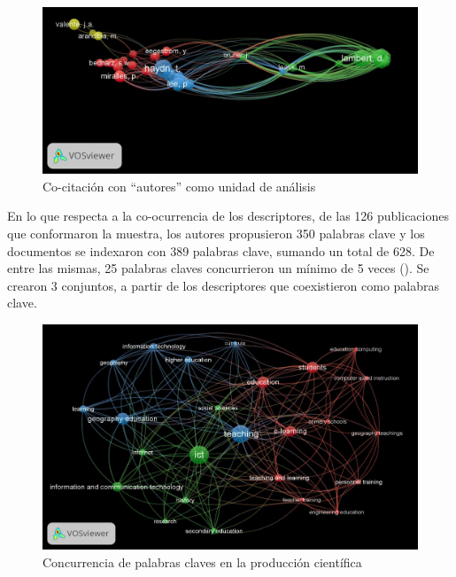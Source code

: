 \documentclass[spanish]{textolivre}
\begin{document}
\begin{figure}[h!]
\centering
\begin{minipage}{.9\textwidth}
 \includegraphics[width=\textwidth]{fig5.jpg}
 \caption{Co-citación con “autores” como unidad de análisis}
 \label{fig5}
\end{minipage}
\end{figure}

En lo que respecta a la co-ocurrencia de los descriptores, de las 126 publicaciones que conformaron la muestra, los autores propusieron 350 palabras clave y los documentos se indexaron con 389 palabras clave, sumando un total de 628. De entre las mismas, 25 palabras claves concurrieron un mínimo de 5 veces (). Se crearon 3 conjuntos, a partir de los descriptores que coexistieron como palabras clave.

\begin{figure}[h!]
\centering
\begin{minipage}{.9\textwidth}
 \includegraphics[width=\textwidth]{fig6.jpg}
 \caption{Concurrencia de palabras claves en la producción científica}
 \label{fig6}
\end{minipage}
\end{figure}
\end{document}
